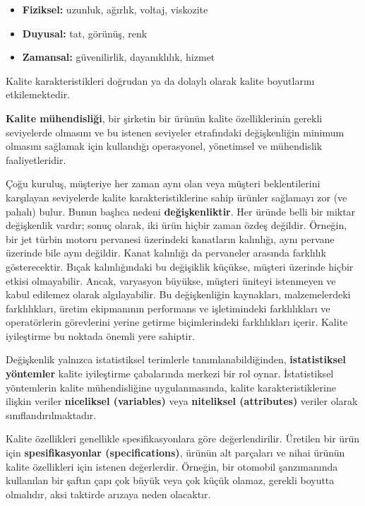 \documentclass[
]{book}
\begin{document}
\begin{itemize}
\item
  \textbf{Fiziksel:} uzunluk, ağırlık, voltaj, viskozite
\item
  \textbf{Duyusal:} tat, görünüş, renk
\item
  \textbf{Zamansal:} güvenilirlik, dayanıklılık, hizmet
\end{itemize}

Kalite karakteristikleri doğrudan ya da dolaylı olarak kalite boyutlarını etkilemektedir.

\textbf{Kalite mühendisliği}, bir şirketin bir ürünün kalite özelliklerinin gerekli seviyelerde olmasını ve bu istenen seviyeler etrafındaki değişkenliğin minimum olmasını sağlamak için kullandığı operasyonel, yönetimsel ve mühendislik faaliyetleridir.

Çoğu kuruluş, müşteriye her zaman aynı olan veya müşteri beklentilerini karşılayan seviyelerde kalite karakteristiklerine sahip ürünler sağlamayı zor (ve pahalı) bulur. Bunun başlıca nedeni \textbf{değişkenliktir}. Her üründe belli bir miktar değişkenlik vardır; sonuç olarak, iki ürün hiçbir zaman özdeş değildir. Örneğin, bir jet türbin motoru pervanesi üzerindeki kanatların kalınlığı, aynı pervane üzerinde bile aynı değildir. Kanat kalınlığı da pervaneler arasında farklılık gösterecektir. Bıçak kalınlığındaki bu değişiklik küçükse, müşteri üzerinde hiçbir etkisi olmayabilir. Ancak, varyasyon büyükse, müşteri üniteyi istenmeyen ve kabul edilemez olarak algılayabilir. Bu değişkenliğin kaynakları, malzemelerdeki farklılıkları, üretim ekipmanının performans ve işletimindeki farklılıkları ve operatörlerin görevlerini yerine getirme biçimlerindeki farklılıkları içerir. Kalite iyileştirme bu noktada önemli yere sahiptir.

Değişkenlik yalnızca istatistiksel terimlerle tanımlanabildiğinden, \textbf{istatistiksel yöntemler} kalite iyileştirme çabalarında merkezi bir rol oynar. İstatistiksel yöntemlerin kalite mühendisliğine uygulanmasında, kalite karakteristiklerine ilişkin veriler \textbf{niceliksel (variables)} veya \textbf{niteliksel (attributes)} veriler olarak sınıflandırılmaktadır.

Kalite özellikleri genellikle spesifikasyonlara göre değerlendirilir. Üretilen bir ürün için \textbf{spesifikasyonlar (specifications)}, ürünün alt parçaları ve nihai ürünün kalite özellikleri için istenen değerlerdir. Örneğin, bir otomobil şanzımanında kullanılan bir şaftın çapı çok büyük veya çok küçük olamaz, gerekli boyutta olmalıdır, aksi taktirde arızaya neden olacaktır.
\end{document}
